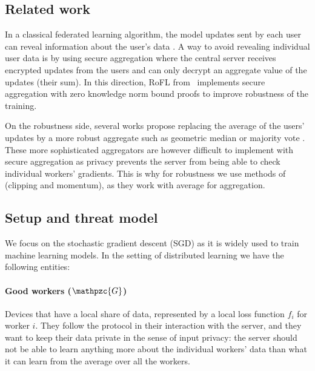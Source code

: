 \documentclass{article}
\newcommand{\gset}{\ensuremath{{\mathpzc{G}}}}
\begin{document}



\subsection{Related work}


In a classical federated learning algorithm, the model updates sent by each user can reveal information about the user's data \parencite{FeatureLeakage}. A way to avoid revealing individual user data is by using secure aggregation \parencite{SecureAggregation} where the central server receives encrypted updates from the users and can only decrypt an aggregate value of the updates (their sum). In this direction, RoFL from~\cite{Rofl} implements secure aggregation with zero knowledge norm bound proofs to improve robustness of the training.

On the robustness side, several works propose replacing the average of the users' updates by a more robust aggregate such as geometric median \parencite{DistributedRobustLearning} or majority vote \parencite{SignSGDMajorityVote}. These more sophisticated aggregators are however difficult to implement with secure aggregation as privacy prevents the server from being able to check individual workers' gradients. This is why for robustness we use methods of \cite{LearningFromHistory} (clipping and momentum), as they work with average for aggregation.


\subsection{Setup and threat model}


We focus on the stochastic gradient descent (SGD) as it is widely used to train machine learning models. In the setting of distributed learning we have the following entities:


\paragraph*{Good workers ($\gset$)} Devices that have a local share of data, represented by a local loss function $f_i$ for worker $i$. They follow the protocol in their interaction with the server, and they want to keep their data private in the sense of input privacy: the server should not be able to learn anything more about the individual workers' data than what it can learn from the average over all the workers.
\end{document}
